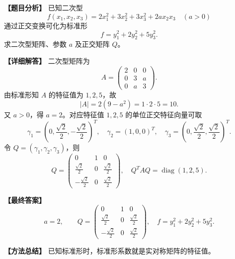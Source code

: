 \documentclass[11pt,a4paper,UTF8]{ctexart}
\newcommand{\diag}{\operatorname{diag}}
\begin{document}
\begin{answerbox}
\textbf{【题目分析】} 已知二次型
\[
f(x_1,x_2,x_3)=2x_1^2+3x_2^2+3x_3^2+2ax_2x_3\quad(a>0)
\]
通过正交变换可化为标准形
\[
f=y_1^2+2y_2^2+5y_3^2.
\]
求二次型矩阵、参数 $a$ 及正交矩阵 $Q$。

\textbf{【详细解答】} 二次型矩阵为
\[
A=\begin{pmatrix}2&0&0\\0&3&a\\0&a&3\end{pmatrix}.
\]
由标准形知 $A$ 的特征值为 $1,2,5$，故
\[
|A|=2(9-a^2)=1\cdot2\cdot5=10.
\]
又 $a>0$，得 $a=2$。对应特征值 $1,2,5$ 的单位正交特征向量可取
\[
\gamma_1=\left(0,\frac{\sqrt2}{2},-\frac{\sqrt2}{2}\right)^T,\quad
\gamma_2=(1,0,0)^T,\quad
\gamma_3=\left(0,\frac{\sqrt2}{2},\frac{\sqrt2}{2}\right)^T.
\]
令 $Q=(\gamma_1,\gamma_2,\gamma_3)$，则
\[
Q=\begin{pmatrix}
0&1&0\\
\frac{\sqrt2}{2}&0&\frac{\sqrt2}{2}\\
-\frac{\sqrt2}{2}&0&\frac{\sqrt2}{2}
\end{pmatrix},
\quad Q^TAQ=\diag(1,2,5).
\]

\textbf{【最终答案】}
\[
a=2,\qquad
Q=\begin{pmatrix}
0&1&0\\
\frac{\sqrt2}{2}&0&\frac{\sqrt2}{2}\\
-\frac{\sqrt2}{2}&0&\frac{\sqrt2}{2}
\end{pmatrix},
\quad f=y_1^2+2y_2^2+5y_3^2.
\]

\textbf{【方法总结】} 已知标准形时，标准形系数就是实对称矩阵的特征值。
\end{answerbox}
\end{document}
